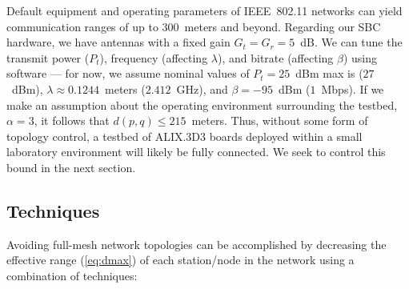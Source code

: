 \documentclass{article}
\begin{document}
Default equipment and operating parameters of IEEE~802.11 networks can yield communication ranges of up to \(300\)~meters and beyond.
Regarding our SBC hardware, we have antennas with a fixed gain \(G_t = G_r = 5\)~dB.
We can tune the transmit power (\(P_t\)), frequency (affecting \(\lambda\)), and bitrate (affecting \(\beta\)) using software --- for now, we assume nominal values of \(P_t = 25\)~dBm max is (\(27\)~dBm), \(\lambda \approx 0.1244\)~meters (\(2.412\)~GHz), and
\(\beta = -95\)~dBm (\(1\)~Mbps).
If we make an assumption about the operating environment surrounding the testbed, \(\alpha = 3\), it follows that \(d(p,q) \leq 215\)~meters.
Thus, without some form of topology control, a testbed of ALIX.3D3 boards deployed within a small laboratory environment will likely be fully connected.
We seek to control this bound in the next section.


\subsection{Techniques}\label{sec:topo-techniques}

Avoiding full-mesh network topologies can be accomplished by decreasing the effective range (\ref{eq:dmax}) of each station/node in the network using a combination of techniques:
\end{document}
